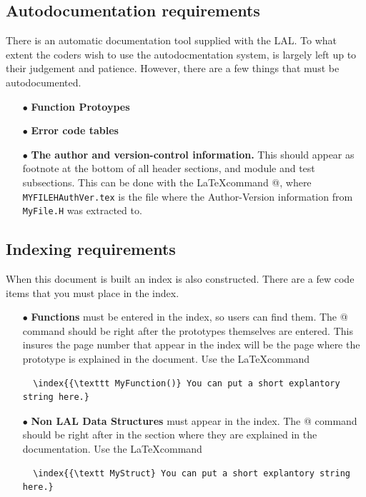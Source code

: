 \documentclass[oneside]{book}
\begin{document}
\subsection{Autodocumentation requirements}
There is an automatic documentation tool supplied with the LAL.
To what extent the coders wish to use the autodocmentation system,
is largely left up to their judgement and patience. However, there
are a few things that must be autodocumented.

\begin{itemize}
  \item[$\bullet$] {\bf Function Protoypes} 
  \item[$\bullet$] {\bf Error code tables }
  \item[$\bullet$] {\bf The author and version-control information.}  This
                        should appear as footnote at the bottom of all
                        header sections, and module and test subsections.
                        This can be done with the \LaTeX command 
                        \verb@\vfill{\footnotesize}@,
                        where {\tt MYFILEHAuthVer.tex} is the file where
                        the Author-Version information from {\tt MyFile.H}
                        was extracted to.
\end{itemize}

\subsection{Indexing requirements}

When this  document is built an index is also constructed. There are a few
code items that you must place in the index.
\begin{itemize}
  \item[$\bullet$] {\bf Functions} must be entered in the index, so
   users can find them. The \verb@\index{}@ command should be right
   after the prototypes themselves are entered.  This insures the page
   number that appear in the index will be the page where the
   prototype is explained in the document.
   Use the \LaTeX command
  \begin{verbatim}
  \index{{\texttt MyFunction()} You can put a short explantory string here.}
  \end{verbatim}
  \vspace*{-0.041in}
  \item[$\bullet$] {\bf Non LAL Data Structures}  must appear in the index.
  The \verb@\index{}@ command should be right after in the section
  where they are explained in the documentation.
  Use the \LaTeX command
  \begin{verbatim}
  \index{{\textt MyStruct} You can put a short explantory string here.}
  \end{verbatim}
\end{itemize}
\end{document}
